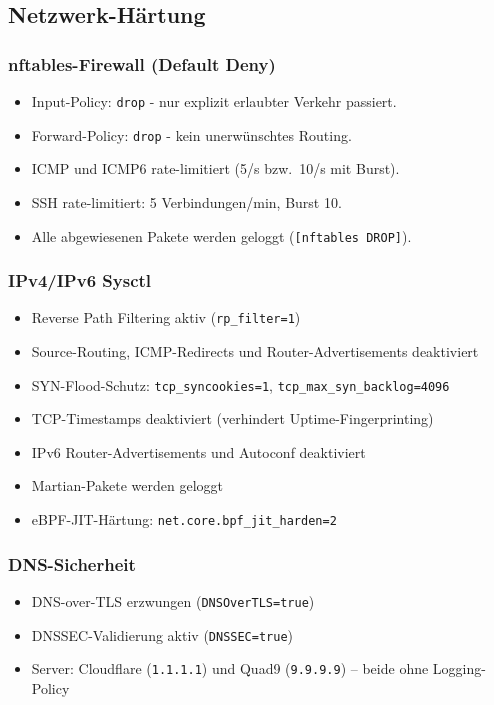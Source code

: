 \subsection{Netzwerk-Härtung}
\subsubsection*{nftables-Firewall (Default Deny)}
\begin{itemize}
  \item Input-Policy: \texttt{drop} - nur explizit erlaubter Verkehr passiert.
  \item Forward-Policy: \texttt{drop} - kein unerwünschtes Routing.
  \item ICMP und ICMP6 rate-limitiert (5/s bzw.\ 10/s mit Burst).
  \item SSH rate-limitiert: 5 Verbindungen/min, Burst 10.
  \item Alle abgewiesenen Pakete werden geloggt (\texttt{[nftables DROP]}).
\end{itemize}

\subsubsection*{IPv4/IPv6 Sysctl}
\begin{itemize}
  \item Reverse Path Filtering aktiv (\texttt{rp\_filter=1})
  \item Source-Routing, ICMP-Redirects und Router-Advertisements deaktiviert
  \item SYN-Flood-Schutz: \texttt{tcp\_syncookies=1}, \texttt{tcp\_max\_syn\_backlog=4096}
  \item TCP-Timestamps deaktiviert (verhindert Uptime-Fingerprinting)
  \item IPv6 Router-Advertisements und Autoconf deaktiviert
  \item Martian-Pakete werden geloggt
  \item eBPF-JIT-Härtung: \texttt{net.core.bpf\_jit\_harden=2}
\end{itemize}

\subsubsection*{DNS-Sicherheit}
\begin{itemize}
  \item DNS-over-TLS erzwungen (\texttt{DNSOverTLS=true})
  \item DNSSEC-Validierung aktiv (\texttt{DNSSEC=true})
  \item Server: Cloudflare (\texttt{1.1.1.1}) und Quad9 (\texttt{9.9.9.9}) -- beide ohne Logging-Policy
\end{itemize}

